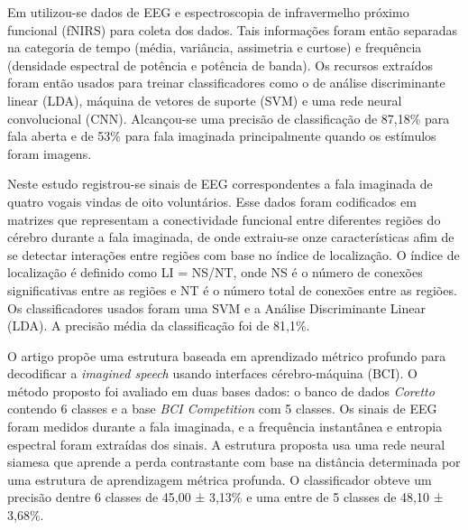\documentclass[a4paper,12pt,openright,oneside]{book}
\newenvironment{myenv}[1]
  {\begin{spacing}{#1}}
  {\end{spacing}}
\begin{document}
\begin{myenv}{1.5}
				\par Em \cite{cooney2021bimodal} utilizou-se dados de EEG e espectroscopia de infravermelho próximo funcional (fNIRS) para coleta dos dados. Tais informações foram então separadas na categoria de tempo (média, variância, assimetria e curtose) e frequência (densidade espectral de potência e potência de banda). Os recursos extraídos foram então usados para treinar classificadores como o de análise discriminante linear (LDA), máquina de vetores de suporte (SVM) e uma rede neural convolucional (CNN). Alcançou-se uma precisão de classificação de 87,18\% para fala aberta e de 53\% para fala imaginada principalmente quando os estímulos foram imagens.\newline
				
				\par Neste estudo \cite{bakhshali2022investigating} registrou-se sinais de EEG correspondentes a fala imaginada de quatro vogais vindas de oito voluntários. Esse dados foram codificados em matrizes que representam a conectividade funcional entre diferentes regiões do cérebro durante a fala imaginada, de onde extraiu-se onze características afim de se detectar interações entre regiões com base no índice de localização. O índice de localização é definido como LI = NS/NT, onde NS é o número de conexões significativas entre as regiões e NT é o número total de conexões entre as regiões. Os classificadores usados foram uma SVM e a Análise Discriminante Linear (LDA). A precisão média da classificação foi de 81,1\%.\newline
				
				\par O artigo \cite{lee2021decoding} propõe uma estrutura baseada em aprendizado métrico profundo para decodificar a \textit{imagined speech} usando interfaces cérebro-máquina (BCI). O método proposto foi avaliado em duas bases dados: o banco de dados \textit{Coretto} contendo 6 classes e a base \textit{BCI Competition} com 5 classes. Os sinais de EEG foram medidos durante a fala imaginada, e a frequência instantânea e entropia espectral foram extraídas dos sinais. A estrutura proposta usa uma rede neural siamesa que aprende a perda contrastante com base na distância determinada por uma estrutura de aprendizagem métrica profunda. O classificador obteve um precisão dentre 6 classes de 45,00 ± 3,13\% e uma entre de 5 classes de 48,10 ± 3,68\%.\newline
	

\end{myenv}
\end{document}
